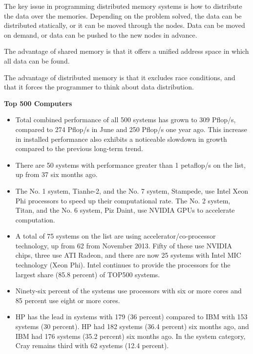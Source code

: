 \documentclass[12pt]{article}
\begin{document}
The key issue in programming distributed memory systems is how to distribute the data over the memories. Depending on the problem solved, the data can be distributed statically, or it can be moved through the nodes. Data can be moved on demand, or data can be pushed to the new nodes in advance. 

The advantage of shared memory is that it offers a unified address space in which all data can be found.

The advantage of distributed memory is that it excludes race conditions, and that it forces the programmer to think about data distribution.




\vspace*{2em}
\noindent \textbf{Top 500 Computers}
\begin{itemize}
\item Total combined performance of all 500 systems has grown to 309 Pflop/s, compared to 274 Pflop/s in June and 250 Pflop/s one year ago. This increase in installed performance also exhibits a noticeable slowdown in growth compared to the previous long-term trend.
\item There are 50 systems with performance greater than 1 petaflop/s on the list, up from 37 six months ago.
\item The No. 1 system, Tianhe-2, and the No. 7 system, Stampede, use Intel Xeon Phi processors to speed up their computational rate. The No. 2 system, Titan, and the No. 6 system, Piz Daint, use NVIDIA GPUs to accelerate computation.
\item A total of 75 systems on the list are using accelerator/co-processor technology, up from 62 from November 2013. Fifty of these use NVIDIA chips, three use ATI Radeon, and there are now 25 systems with Intel MIC technology (Xeon Phi). Intel continues to provide the processors for the largest share (85.8 percent) of TOP500 systems.
\item Ninety-six percent of the systems use processors with six or more cores and 85 percent use eight or more cores.
\item HP has the lead in systems with 179 (36 percent) compared to IBM with 153 systems (30 percent). HP had 182 systems (36.4 percent) six months ago, and IBM had 176 systems (35.2 percent) six months ago. In the system category, Cray remains third with 62 systems (12.4 percent).
\end{itemize}
\end{document}
